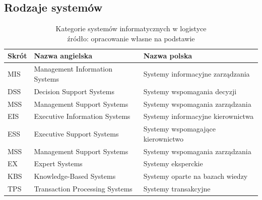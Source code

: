 	\subsection{Rodzaje systemów}
		\begin{table}[h]
			\centering
			\begin{tabular}{|l|l|l|}
				\hline				
				\textbf{Skrót} 		& \textbf{Nazwa angielska}						& \textbf{Nazwa polska} \\
				\hline
				MIS					& Management Information Systems 				& Systemy informacyjne zarządzania	\\
				\hline
				DSS					& Decision Support Systems						& Systemy wspomagania decyzji		\\
				\hline
				MSS					& Management Support Systems					& Systemy wspomagania zarządzania	\\
				\hline	
				EIS					& Executive Information Systems					& Systemy informacyjne kierownictwa	\\
				\hline	
				ESS					& Executive Support Systems						& Systemy wspomagające kierownictwo	\\
				\hline	
				MSS					& Management Support Systems					& Systemy wspomagania zarządzania	\\
				\hline	
				EX					& Expert Systems								& Systemy eksperckie	\\
				\hline	
				KBS					& Knowledge-Based Systems						& Systemy oparte na bazach wiedzy	\\
				\hline	
				TPS					& Transaction Processing Systems				& Systemy transakcyjne	\\
				\hline
			\end{tabular}
			\caption[Kategorie systemów informatycznych w logistyce]{
				Kategorie systemów informatycznych w logistyce\\
				źródło: opracowanie własne na podstawie \cite{IDL}
			}
		\end{table}
		
